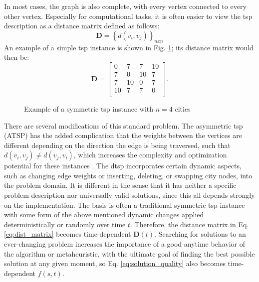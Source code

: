 In most cases, the graph is also complete, with every vertex connected to every other vertex. Especially for computational tasks, it is often easier to view the \gls{tsp} description as a distance matrix defined as follows:
\begin{equation} 
	\label{eq:dist_matrix}
	\textbf{D} = \left\lbrace d(v_i,v_j) \right\rbrace_{nxn}
\end{equation}
An example of a simple \gls{tsp} instance is shown in Fig. \ref{fig:ExampleTSP}; its distance matrix would then be:
$$
\textbf{D} =
 \begin{bmatrix}
	0 & 7 &7 & 10\\
	7 & 0 & 10 & 7\\
	7 & 10 & 0 & 7\\
	10 & 7 & 7 & 0\\
\end{bmatrix}
. $$
  \begin{figure}
  	\centering
    \caption{Example of a symmetric \gls{tsp} instance with $n=4$ cities}
    \label{fig:ExampleTSP}
\end{figure}


There are several modifications of this standard problem. The asymmetric \gls{tsp} (ATSP) has the added complication that the weights between the vertices are different depending on the direction the edge is being traversed, such that $d(v_i, v_j) \neq d(v_j,v_i)$, which increases the complexity and optimization potential for these instances \cite{johnson2007experimental}.
The \gls{dtsp} incorporates certain dynamic aspects, such as changing edge weights or inserting, deleting, or swapping city nodes, into the problem domain. It is different in the sense that it has neither a specific problem description nor universally valid solutions, since this all depends strongly on the implementation. The basis is often a traditional symmetric \gls{tsp} instance with some form of the above mentioned dynamic changes applied deterministically or randomly over time $t$. Therefore, the distance matrix in Eq. \eqref{eq:dist_matrix} becomes time-dependent $\textbf{D}(t)$. Searching for solutions to an ever-changing problem increases the importance of a good anytime behavior of the algorithm or metaheuristic, with the ultimate goal of finding the best possible solution at any given moment, so Eq. \eqref{eq:solution_quality} also becomes time-dependent $f(s,t)$. 


